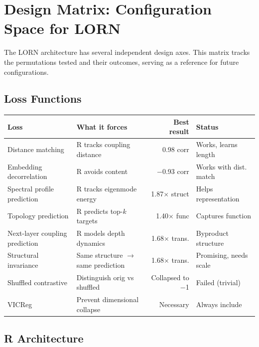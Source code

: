 \documentclass[11pt, a4paper]{article}
\theoremstyle{plain}
\theoremstyle{definition}
\theoremstyle{remark}
\begin{document}
\section{Design Matrix: Configuration Space for LORN}
\label{app:design-matrix}

The LORN architecture has several independent design axes.
This matrix tracks the permutations tested and their outcomes, serving as a reference for future configurations.

\subsection{Loss Functions}

\begin{center}\small
\begin{tabular}{llrl}
\toprule
\textbf{Loss} & \textbf{What it forces} & \textbf{Best result} & \textbf{Status} \\
\midrule
Distance matching & R tracks coupling distance & 0.98 corr & Works, learns length \\
Embedding decorrelation & R avoids content & $-$0.93 corr & Works with dist. match \\
Spectral profile prediction & R tracks eigenmode energy & 1.87$\times$ struct & Helps representation \\
Topology prediction & R predicts top-$k$ targets & 1.40$\times$ func & Captures function \\
Next-layer coupling prediction & R models depth dynamics & 1.68$\times$ trans. & Byproduct structure \\
Structural invariance & Same structure $\to$ same prediction & 1.68$\times$ trans. & Promising, needs scale \\
Shuffled contrastive & Distinguish orig vs shuffled & Collapsed to $-$1 & Failed (trivial) \\
VICReg & Prevent dimensional collapse & Necessary & Always include \\
\bottomrule
\end{tabular}
\end{center}

\subsection{R Architecture}
\end{document}
